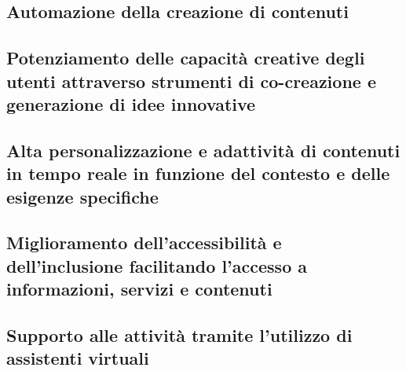     \subsection{Automazione della creazione di contenuti}
    
    \subsection{Potenziamento delle capacità creative degli utenti attraverso strumenti di co-creazione e generazione di idee innovative}
    
    \subsection{Alta personalizzazione e adattività di contenuti in tempo reale in funzione del contesto e delle esigenze specifiche}
    
    \subsection{Miglioramento dell'accessibilità e dell'inclusione facilitando l'accesso a informazioni, servizi e contenuti}
    
    \subsection{Supporto alle attività tramite l’utilizzo di assistenti virtuali}
    
    